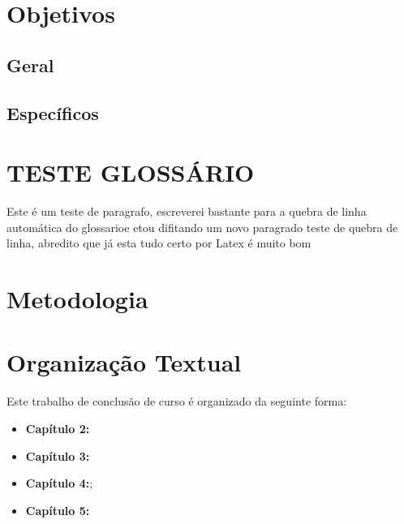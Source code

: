 \section{Objetivos}

\subsection{Geral}

\subsection{Específicos}

\section{TESTE GLOSSÁRIO}
	Este é um teste de paragrafo, escreverei bastante para a quebra de linha automática do glossarioe etou difitando um novo paragrado teste de quebra de linha, abredito que já esta tudo certo por Latex é muito bom


\section{Metodologia}


\section{Organização Textual}

Este trabalho de conclusão de curso é organizado da seguinte forma:

\begin{itemize}
    \item \textbf{Capítulo 2:} 
    
    \item \textbf{Capítulo 3:}

    \item \textbf{Capítulo 4:};

    \item \textbf{Capítulo 5:} 
\end{itemize}



